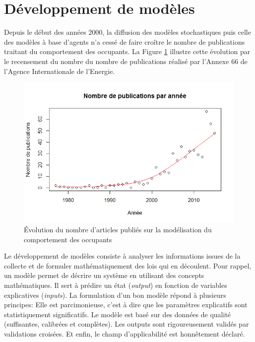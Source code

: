 \section{Développement de modèles}
\label{Développement de modèles}

Depuis le début des années 2000, la diffusion des modèles stochastiques puis celle des modèles à base d'agents n'a cessé de faire croître le nombre de publications traitant du comportement des occupants. La Figure \ref{fig:NbPerYear} illustre cette évolution par le recensement du nombre du nombre de publications réalisé par l'Annexe 66 de l'Agence Internationale de l'Energie. 

\begin{figure}[H]
\centering
\includegraphics[scale=0.6]{Images/NbPerYear/NbPerYear}
\caption{Évolution du nombre d'articles publiés sur la modélisation du comportement des occupants}
\label{fig:NbPerYear}
\end{figure}

Le développement de modèles consiste à analyser les informations issues de la collecte et de formuler mathématiquement des lois qui en découlent. Pour rappel, un modèle permet de décrire un système en utilisant des concepts mathématiques. Il sert à prédire un état (\textit{output}) en fonction de variables explicatives (\textit{inputs}). La formulation d'un bon modèle répond à plusieurs principes: Elle est parcimonieuse, c'est à dire que les paramètres explicatifs sont statistiquement significatifs. Le modèle est basé sur des données de qualité (suffisantes, calibrées et complètes). Les outputs sont rigoureusement validés par validations croisées. Et enfin, le champ d'applicabilité est honnêtement déclaré.

